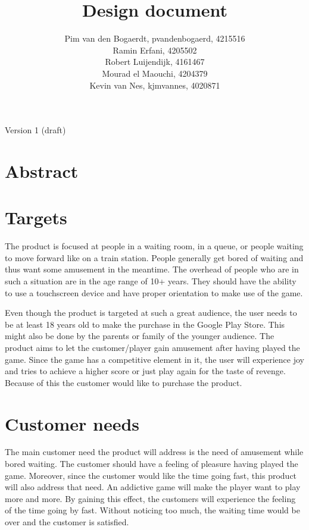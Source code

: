 \documentclass[12pt,twoside,a4paper]{article}
\title{Design document}
\author{
	Pim van den Bogaerdt, pvandenbogaerd, 4215516\\
	Ramin Erfani, 4205502\\
	Robert Luijendijk, 4161467\\
	Mourad el Maouchi, 4204379\\
  Kevin van Nes, kjmvannes, 4020871
}
\begin{document}
\maketitle
\begin{center}
Version 1 (draft)
\end{center}
\clearpage

\section*{Abstract}


\clearpage
\tableofcontents

\clearpage

\section{Targets}
The product is focused at people in a waiting room, in a queue, or people waiting to move forward like on a train station. People generally get bored of waiting and thus want some amusement in the meantime. The overhead of people who are in such a situation are in the age range of 10+ years. They should have the ability to use a touchscreen device and have proper orientation to make use of the game.

Even though the product is targeted at such a great audience, the user needs to be at least 18 years old to make the purchase in the Google Play Store. This might also be done by the parents or family of the younger audience. The product aims to let the customer/player gain amusement after having played the game. Since the game has a competitive element in it, the user will experience joy and tries to achieve a higher score or just play again for the taste of revenge. Because of this the customer would like to purchase the product.

\section{Customer needs}
The main customer need the product will address is the need of amusement while bored waiting. The customer should have a feeling of pleasure having played the game. Moreover, since the customer would like the time going fast, this product will also address that need. An addictive game will make the player want to play more and more. By gaining this effect, the customers will experience the feeling of the time going by fast. Without noticing too much, the waiting time would be over and the customer is satisfied.
\end{document}
